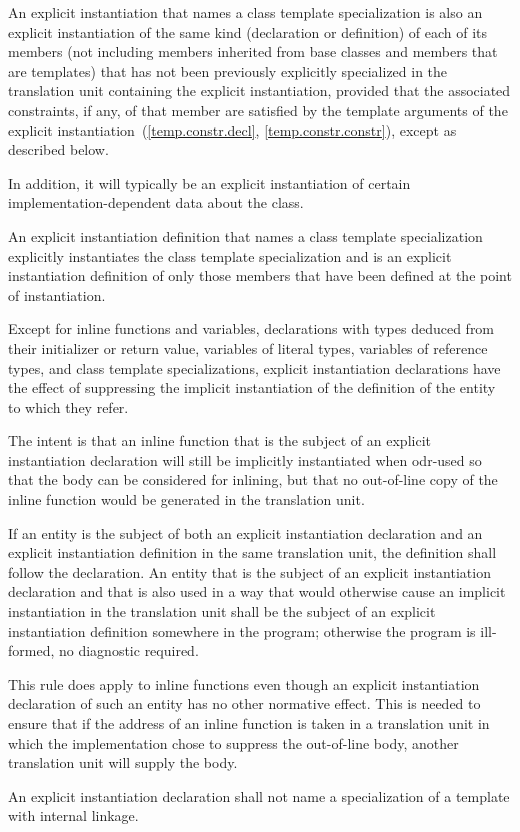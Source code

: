 \pnum
An explicit instantiation that names a class
template specialization is also an explicit
instantiation of the same kind (declaration or definition) of each
of its members (not including members inherited from base classes and members
that are templates) that has not been previously explicitly specialized in
the translation unit containing the explicit instantiation,
provided that the associated constraints, if any,
of that member are satisfied by the template arguments of the explicit
instantiation~(\ref{temp.constr.decl}, \ref{temp.constr.constr}),
except as described below.
\begin{note} In addition, it will typically be an explicit instantiation of certain
%
implementation-dependent data about the class. \end{note}

\pnum
An explicit instantiation definition that names a class template
specialization explicitly instantiates the class template specialization
and is an explicit instantiation definition of only those
members that have been defined at the point of instantiation.

\pnum
Except for inline functions and variables, declarations with types deduced from their
initializer or return value,  variables of
literal types,
variables of reference types, and class template specializations,
explicit instantiation declarations have the
effect of suppressing the implicit instantiation
of the definition of the entity to which they refer.
\begin{note} The intent is that an inline function that is the
subject of an explicit instantiation declaration will still be implicitly
instantiated when odr-used so that the body can be considered for inlining, but
that no out-of-line copy of the inline function would be generated in the
translation unit.\end{note}

\pnum
If an entity is the subject of both an explicit instantiation declaration
and an explicit instantiation definition in the same translation unit, the
definition shall follow the declaration. An entity that is the subject of an
explicit instantiation declaration and that is also used
in a way that would otherwise cause an implicit instantiation
in the translation unit
shall be the subject of an explicit instantiation definition somewhere in the
program; otherwise the program is ill-formed, no diagnostic required.
\begin{note} This rule does apply to inline functions even though an
explicit instantiation declaration of such an entity has no other normative
effect. This is needed to ensure that if the address of an inline function is
taken in a translation unit in which the implementation chose to suppress the
out-of-line body, another translation unit will supply the body.\end{note}
An explicit instantiation declaration shall not name a specialization of a
template with internal linkage.

